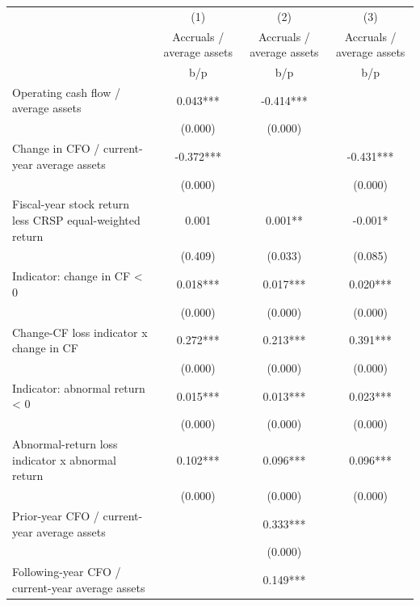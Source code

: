 {
\def\sym#1{\ifmmode^{#1}\else\(^{#1}\)\fi}
\begin{tabular}{l*{3}{c}}
\hline\hline
                    &\multicolumn{1}{c}{(1)}&\multicolumn{1}{c}{(2)}&\multicolumn{1}{c}{(3)}\\
                    &\multicolumn{1}{c}{Accruals / average assets}&\multicolumn{1}{c}{Accruals / average assets}&\multicolumn{1}{c}{Accruals / average assets}\\
                    &         b/p   &         b/p   &         b/p   \\
\hline
Operating cash flow / average assets&       0.043***&      -0.414***&               \\
                    &     (0.000)   &     (0.000)   &               \\
Change in CFO / current-year average assets&      -0.372***&               &      -0.431***\\
                    &     (0.000)   &               &     (0.000)   \\
Fiscal-year stock return less CRSP equal-weighted return&       0.001   &       0.001** &      -0.001*  \\
                    &     (0.409)   &     (0.033)   &     (0.085)   \\
Indicator: change in CF < 0&       0.018***&       0.017***&       0.020***\\
                    &     (0.000)   &     (0.000)   &     (0.000)   \\
Change-CF loss indicator x change in CF&       0.272***&       0.213***&       0.391***\\
                    &     (0.000)   &     (0.000)   &     (0.000)   \\
Indicator: abnormal return < 0&       0.015***&       0.013***&       0.023***\\
                    &     (0.000)   &     (0.000)   &     (0.000)   \\
Abnormal-return loss indicator x abnormal return&       0.102***&       0.096***&       0.096***\\
                    &     (0.000)   &     (0.000)   &     (0.000)   \\
Prior-year CFO / current-year average assets&               &       0.333***&               \\
                    &               &     (0.000)   &               \\
Following-year CFO / current-year average assets&               &       0.149***&               \\

\end{tabular}}
